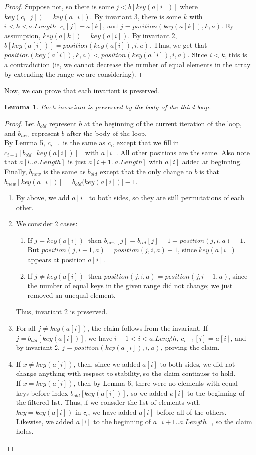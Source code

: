 \documentclass{article}
\newtheorem{lemma}[theorem]{Lemma}
\begin{document}
\begin{proof}
Suppose not, so there is some $j < b[key(a[i])]$ where $key(c_i[j]) = key(a[i])$. By invariant 3, there is some $k$ with $i < k < a.Length$, $c_i[j] = a[k]$, and $j = position(key(a[k]), k, a)$. By assumption, $key(a[k]) = key(a[i])$. By invariant 2, $b[key(a[i])] = position(key(a[i]), i, a)$. Thus, we get that $position(key(a[i]), k, a) < position(key(a[i]), i, a)$. Since $i< k$, this is a contradiction (ie, we cannot decrease the number of equal elements in the array by extending the range we are considering).
\end{proof}
Now, we can prove that each invariant is preserved.
\begin{lemma}
Each invariant is preserved by the body of the third loop.
\end{lemma}
\begin{proof}
Let $b_{old}$ represent $b$ at the beginning of the current iteration of the loop, and $b_{new}$ represent $b$ after the body of the loop.
\\By Lemma 5, $c_{i-1}$ is the same as $c_i$, except that we fill in $c_{i-1}[b_{old}[key(a[i])]]$ with $a[i]$. All other positions are the same. Also note that $a[i..a.Length]$ is just $a[i+1..a.Length]$ with $a[i]$ added at beginning. Finally, $b_{new}$ is the same as $b_{old}$ except that  the only change to $b$ is that $b_{new}[key(a[i])] = b_{old}(key(a[i])] - 1$.
\begin{enumerate}
\item
By above, we add $a[i]$ to both sides, so they are still permutations of each other.
\item
We consider 2 cases:
\begin{enumerate}
\item
If $j=key(a[i])$, then $b_{new}[j] = b_{old}[j] -1 = position(j, i, a) - 1$. But $position(j, i-1, a) = position(j, i, a) - 1$, since $key(a[i])$ appears at position $a[i]$.
\item
If $j \neq key(a[i])$, then $position(j, i, a) = position(j, i-1, a)$, since the number of equal keys in the given range did not change; we just removed an unequal element.
\end{enumerate}
Thus, invariant 2 is preserved.
\item
For all $j\neq key(a[i])$, the claim follows from the invariant. If $j=b_{old}[key(a[i])]$, we have $i-1 < i < a.Length$, $c_{i-1}[j] = a[i]$, and by invariant 2, $j = position(key(a[i]), i, a)$, proving the claim.
\item
If $x\neq key(a[i])$, then, since we added $a[i]$ to both sides, we did not change anything with respect to stability, so the claim continues to hold.
\\If $x = key(a[i])$, then by Lemma 6, there were no elements with equal keys before index $b_{old}[key(a[i])]$, so we added $a[i]$ to the beginning of the filtered list. Thus, if we consider the list of elements with $key=key(a[i])$ in $c_i$, we have added $a[i]$ before all of the others. Likewise, we added $a[i]$ to the beginning of $a[i+1..a.Length]$, so the claim holds.
\end{enumerate}
\end{proof}
\end{document}
